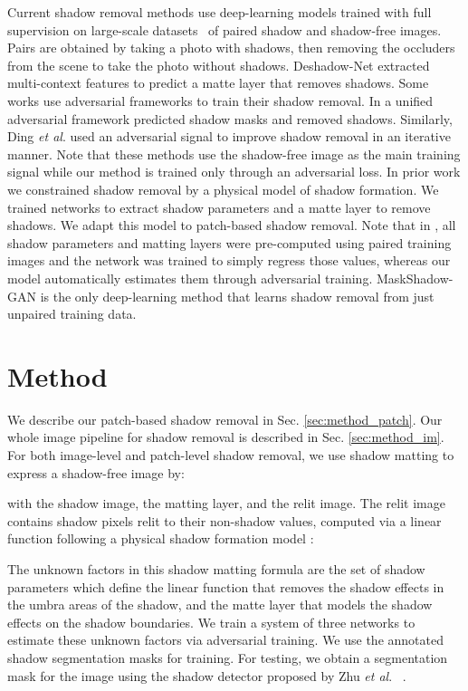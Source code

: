 \documentclass[runningheads]{llncs}
\def\etal{\emph{et al}.}
\begin{document}
Current shadow removal methods \cite{Le-etal-ICCV19,Hu_2018_CVPR,Zhang:AAA2020,Ding2019ARGANAR,Wang_2018_CVPR} use deep-learning models  trained with full supervision on large-scale datasets~\cite{Wang_2018_CVPR,Qu_2017_CVPR}  of paired shadow and shadow-free images. Pairs are obtained by taking a photo with shadows, then removing the occluders from the scene to take the photo without shadows. Deshadow-Net \cite{Qu_2017_CVPR} extracted multi-context features to predict a matte layer that removes shadows. Some works use adversarial frameworks to train their shadow removal. In \cite{Wang_2018_CVPR} a unified adversarial framework predicted shadow masks and removed shadows. Similarly, Ding \etal \cite{Ding2019ARGANAR} used an adversarial signal to improve shadow removal in an iterative manner. Note that these methods use the shadow-free image as the main training signal while our method is trained only through an adversarial loss. In prior work \cite{Le-etal-ICCV19}  we constrained shadow removal by a physical model of shadow formation. We trained networks to extract shadow parameters and a matte layer to remove shadows. We adapt this model to patch-based shadow removal. Note that in \cite{Le-etal-ICCV19}, all  shadow parameters and matting layers were pre-computed using paired training images and the network was trained to simply regress those values, whereas our model automatically estimates them through adversarial training.  MaskShadow-GAN \cite{Hu_2018_CVPR} is the only deep-learning method that learns shadow removal from just unpaired training data.

\section{Method}
We describe our patch-based shadow removal in Sec. \ref{sec:method_patch}. Our whole image pipeline for shadow removal  is described in Sec. \ref{sec:method_im}. For both image-level and patch-level shadow removal, we use  shadow matting \cite{Chuang2003,Porter1984,Smith1996,Wright} to express a shadow-free image  by: 


with    the shadow image,  the matting layer, and  the relit image. The relit image contains shadow pixels relit to their non-shadow values,  computed via a linear function following a physical shadow formation model  \cite{Le-etal-ICCV19,Shor08}:


The unknown factors in this shadow matting formula are the set of shadow parameters  which define the linear function that removes the shadow effects in the umbra areas of the shadow, and the matte layer  that models the shadow effects on the shadow boundaries. We train a system of three networks to estimate these unknown factors via adversarial training. We use the annotated shadow segmentation masks for training. For testing, we obtain a segmentation mask for the image using the shadow detector proposed by Zhu \etal~ \cite{zhu18b}.
\end{document}
